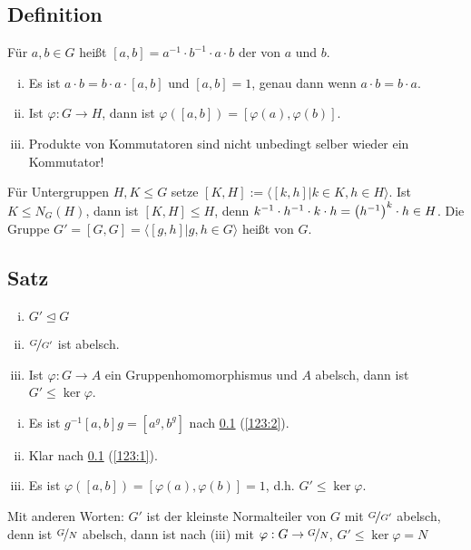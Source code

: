 \subsection[Definition: Kommutator]{Definition} %
\label{sub:123}
Für $a,b \in G$ heißt $[a,b] = a ^{-1} \cdot b ^{-1} \cdot a \cdot b$ der  von $a$ und $b$.
\begin{enumerate}[(i)]
	\item\label{123:1} Es ist $a \cdot b = b \cdot a \cdot [a,b]$ und $[a,b]= 1$, genau dann wenn $a \cdot b=b \cdot a$.
	\item\label{123:2} Ist $\varphi : G \to H$, dann ist $\varphi([a,b])= [\varphi(a), \varphi(b)]$.
	\item\label{123:3} Produkte von Kommutatoren sind nicht unbedingt selber wieder ein Kommutator!
\end{enumerate} 
Für Untergruppen $H, K \le G$ setze $[K,H] := \big\langle [k,h] \vert k \in K, h \in H \big\rangle$. Ist $K \le N_G(H)$, dann ist $[K,H] \le H$, denn 
$k ^{-1} \cdot h ^{-1} \cdot k \cdot h  = \enbrace*{h ^{-1}}^k \cdot h\in H$. Die Gruppe $G' = [G,G] = \big\langle [g,h] \vert g,h \in G \big\rangle$
heißt  von $G$.

\subsection[Satz: Eigenschaften der Kommutatorgruppe]{Satz} %
\label{sub:124}
\begin{enumerate}[(i)]
	\item $G' \unlhd G$
	\item $\nicefrac{G}{G'}$ ist abelsch.
	\item Ist $\varphi : G \to A$ ein Gruppenhomomorphismus und $A$ abelsch, dann ist $G' \le \ker \varphi$.
\end{enumerate}
\begin{enumerate}[(i)]
	\item Es ist $g ^{-1} [a,b] g = [a^g, b^g]$ nach \ref{sub:123} (\ref{123:2}).
	\item Klar nach \ref{sub:123} (\ref{123:1}).
	\item Es ist $\varphi([a,b]) = [\varphi(a), \varphi(b)] = 1$, d.h. $G' \le \ker \varphi$. \bewende
\end{enumerate}
Mit anderen Worten: $G'$ ist der kleinste Normalteiler von $G$ mit $\nicefrac{G}{G'}$ abelsch, denn ist $\nicefrac{G}{N}$ abelsch, dann ist nach (iii) mit 
$\varphi : G \to \nicefrac{G}{N}$, $G' \le \ker \varphi = N$

